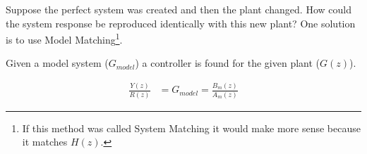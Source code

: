 \documentclass{article}
\begin{document}
%
%
%
%
%
%
%

Suppose the perfect system was created and then the plant changed.
How could the system response be reproduced identically with this new plant?
One solution is to use Model Matching\footnote{If this method was called
System Matching it would make more sense because it matches $H(z)$.}.

Given a model system ($G_{model}$) a controller is found for the
given plant ($G(z)$).

\begin{align}
	\frac{Y(z)}{R(z)} &= G_{model} = \frac{B_m(z)}{A_m(z)}
\end{align}
\end{document}

